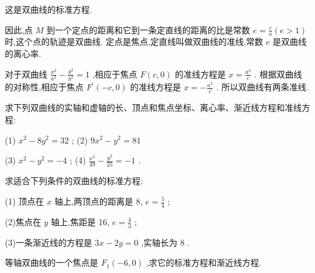 \documentclass[lang=cn,newtx,12pt,scheme=chinese]{elegantbook}
\begin{document}
这是双曲线的标准方程.

因此,点 \(M\) 到一个定点的距离和它到一条定直线的距离的比是常数 \(e = \frac{c}{a}\left( {e > 1}\right)\) 时,这个点的轨迹是双曲线. 定点是焦点,定直线叫做双曲线的准线,常数 \(e\) 是双曲线的离心率.

对于双曲线 \(\frac{{x}^{2}}{{a}^{2}} - \frac{{y}^{2}}{{b}^{2}} = 1\) ,相应于焦点 \(F\left( {c,0}\right)\) 的准线方程是 \(x = \frac{{a}^{2}}{c}\) . 根据双曲线的对称性,相应于焦点 \({F}^{\prime }\left( {-c,0}\right)\) 的准线方程是 \(x = - \frac{{a}^{2}}{c}\) . 所以双曲线有两条准线.

\begin{problemset}[练习]

\item 求下列双曲线的实轴和虚轴的长、顶点和焦点坐标、离心率、渐近线方程和准线方程:

(1) \({x}^{2} - 8{y}^{2} = {32}\) ; (2) \(9{x}^{2} - {y}^{2} = {81}\)

(3) \({x}^{2} - {y}^{2} = - 4\) ; (4) \(\frac{{x}^{2}}{49} - \frac{{y}^{2}}{25} = - 1\) .

\item 求适合下列条件的双曲线的标准方程:

(1) 顶点在 \(x\) 轴上,两顶点的距离是 8, \(e = \frac{5}{4}\) ;

(2)焦点在 \(y\) 轴上,焦距是 16, \(e = \frac{4}{3}\) ;

(3)一条渐近线的方程是 \({3x} - {2y} = 0\) ,实轴长为 8 .

\item 等轴双曲线的一个焦点是 \({F}_{1}\left( {-6,0}\right)\) ,求它的标准方程和渐近线方程.

\end{problemset}
\end{document}

